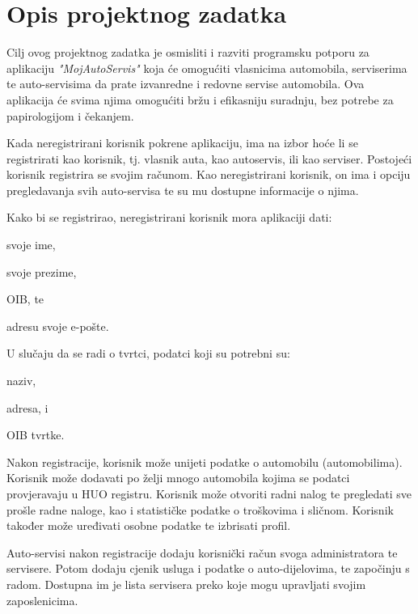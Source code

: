 \chapter{Opis projektnog zadatka}
		
		

		Cilj ovog projektnog zadatka je osmisliti i razviti programsku potporu za aplikaciju \textit{"MojAutoServis"} koja će omogućiti vlasnicima automobila, serviserima te auto-servisima da prate izvanredne i redovne servise automobila. Ova aplikacija će svima njima omogućiti bržu i efikasniju suradnju, bez potrebe za papirologijom i čekanjem. 
		
		Kada neregistrirani korisnik pokrene aplikaciju, ima na izbor hoće li se registrirati kao korisnik, tj. vlasnik auta, kao autoservis, ili kao serviser. Postojeći korisnik registrira se svojim računom. Kao neregistrirani korisnik, on ima i opciju pregledavanja svih auto-servisa te su mu dostupne informacije o njima.
		
		Kako bi se registrirao, neregistrirani korisnik mora aplikaciji dati:
		\begin{packed_item}
			\item svoje ime,
			\item svoje prezime,
			\item OIB, te
			\item adresu svoje e-pošte.
		\end{packed_item}
		
		U slučaju da se radi o tvrtci, podatci koji su potrebni su:
		\begin{packed_item}
			\item naziv,
			\item adresa, i
			\item OIB tvrtke.
		\end{packed_item}
		
		Nakon registracije, korisnik može unijeti podatke o automobilu (automobilima). Korisnik može dodavati po želji mnogo automobila kojima se podatci provjeravaju u HUO registru. Korisnik može otvoriti radni nalog te pregledati sve prošle radne naloge, kao i statističke podatke o troškovima i sličnom. Korisnik također može uređivati osobne podatke te izbrisati profil.
		
		Auto-servisi nakon registracije dodaju korisnički račun svoga administratora te servisere. Potom dodaju cjenik usluga i podatke o auto-dijelovima, te započinju s radom. Dostupna im je lista servisera preko koje mogu upravljati svojim zaposlenicima.  
		
